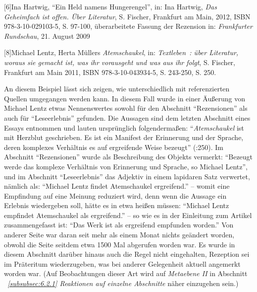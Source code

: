 \documentclass[fontsize=12pt]{scrartcl}
\begin{document}
{\tiny[6]Ina Hartwig, "`Ein Held namens Hungerengel"', in: Ina Hartwig, \textit{Das Geheimfach ist offen. \"Uber Li\-te\-ra\-tur}, S. Fischer, Frankfurt am Main, 2012, ISBN 978-3-10-029103-5, S. 97-100, \"uberarbeitete Fassung der Rezension in: \textit{Frankfurter Rundschau}, 21. August 2009\par}
{\tiny[8]Michael Lentz, Herta M\"ullers \textit{Atemschaukel}, in: \textit{Textleben : \"uber Li\-te\-ra\-tur, woraus sie gemacht ist, was ihr vorausgeht und was aus ihr folgt}, S. Fischer, Frankfurt am Main 2011, ISBN 978-3-10-043934-5, S. 243-250, S. 250.\par}

\onehalfspacing
An diesem Beispiel l\"asst sich zeigen, wie unterschiedlich mit referenzierten Quellen umgegangen werden kann. In diesem Fall wurde in einer \"Au{\ss}erung von Michael Lentz etwas Nennenswertes sowohl f\"ur den Abschnitt "`Rezensionen"' als auch f\"ur "`Leseerlebnis"' gefunden. Die Aussagen sind dem letzten Abschnitt eines Essays entnommen und lauten urspr\"ung\-lich folgenderma{\ss}en: "`\textit{Atemschaukel} ist mit Herzblut geschrieben. Es ist ein Manifest der Erinnerung und der Sprache, deren komplexes Verh\"altnis es auf ergreifende Weise bezeugt"' (\cite{Lentz2011}:250). Im Abschnitt "`Rezensionen"' wurde als Beschreibung des Objekts vermerkt: "`Bezeugt werde das komplexe Verh\"altnis von Erinnerung und Sprache, so Michael Lentz"', und im Abschnitt "`Leseerlebnis"' das Adjektiv in einem lapidaren Satz verwertet, n\"amlich als: "`Michael Lentz fin\-det Atemschaukel ergreifend."' -- womit eine Empfindung auf eine Meinung reduziert wird, denn wenn die Aussage ein Erlebnis wiedergeben soll, h\"atte es in etwa hei{\ss}en m\"ussen: "`Michael Lentz empfindet Atemschaukel als ergreifend."' -- so wie es in der Einleitung zum Artikel zusammengefasst ist: "`Das Werk ist als ergreifend empfunden worden."' Von an\-de\-rer Seite war daran seit mehr als einem Monat nichts ge\"andert worden, obwohl die Seite seitdem etwa 1500 Mal abgerufen worden war. Es wurde in diesem Abschnitt dar\"uber hinaus auch die Regel nicht eingehalten, Rezeption sei im Pr\"ateritum wiederzugeben, was bei an\-de\-rer Gelegenheit aktuell angemerkt worden war. (Auf Beobachtungen dieser Art wird auf \textit{Metaebene II} in Abschnitt \textit{~\ref{subsubsec:6.2.1} Reaktionen auf einzelne Abschnitte} n\"aher einzugehen sein.)
\end{document}
